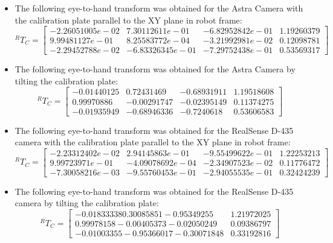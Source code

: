 \begin{itemize}
\item The following eye-to-hand transform was obtained for the Astra Camera with the calibration plate parallel to the XY plane in robot frame:
\begin{equation}
^{R}T_{C}=\begin{bmatrix} -2.26051005e-02 & 7.30112611e-01 & -6.82952842e-01 & 1.19260379\\9.99481127e-01 & 8.25583772e-04 & -3.21992981e-02 & 0.12098781\\ -2.29452788e-02 & -6.83326345e-01 & -7.29752438e-01 & 0.53569317 \end{bmatrix}
\end{equation}


				
\item The following eye-to-hand transform was obtained for the Astra Camera by tilting the calibration plate:
\begin{equation}
^{R}T_{C}=\begin{bmatrix} -0.01440125 & 0.72431469 & -0.68931911 & 1.19518608\\0.99970886 & -0.00291747 & -0.02395149 & 0.11374275\\ -0.01935949 & -0.68946336 & -0.7240618 & 0.53606583 \end{bmatrix}
\end{equation}



\item The following eye-to-hand transform was obtained for the RealSense D-435 camera with the calibration plate parallel to the XY plane in robot frame:
\begin{equation}
^{R}T_{C}=\begin{bmatrix} -2.23312402e-02 & 2.94145863e-01 & -9.55499622e-01 &1.22253213\\9.99723971e-01 & -4.09078692e-04 & -2.34907523e-02 & 0.11776472 \\ -7.30058216e-03 & -9.55760453e-01 & -2.94055535e-01 & 0.32424239  \end{bmatrix}
\end{equation}



\item The following eye-to-hand transform was obtained for the RealSense D-435 camera by tilting the calibration plate:
\begin{equation}
^{R}T_{C}=\begin{bmatrix} -0.01833338  0.30085851 -0.95349255 & 1.21972025\\0.99978158 -0.00405373 -0.02050249& 0.09386797\\ -0.01003355 -0.95366017 -0.30071848& 0.33192816\end{bmatrix}
\end{equation}
\end{itemize}


